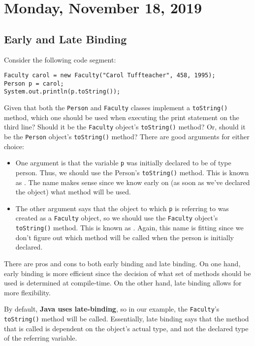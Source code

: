 \section{Monday, November 18, 2019}

\subsection{Early and Late Binding}


Consider the following code segment:

\begin{lstlisting}
Faculty carol = new Faculty("Carol Tuffteacher", 458, 1995);
Person p = carol;
System.out.println(p.toString());
\end{lstlisting}

Given that both the \verb!Person! and \verb!Faculty! classes implement a \verb!toString()! method, which one should be used when executing the print statement on the third line? Should it be the \verb!Faculty! object's \verb!toString()! method? Or, should it be the \verb!Person! object's \verb!toString()! method? There are good arguments for either choice:
\begin{itemize}
    \item One argument is that the variable \verb!p! was initially declared to be of type person. Thus, we should use the Person's \verb!toString()! method. This is known as . The name makes sense since we know early on (as soon as we've declared the object) what method will be used.
    \item The other argument says that the object to which \verb!p! is referring to was created as a \verb!Faculty! object, so we should use the \verb!Faculty! object's \verb!toString()! method. This is known as . Again, this name is fitting since we don't figure out which method will be called when the person is initially declared.
\end{itemize}

There are pros and cons to both early binding and late binding. On one hand, early binding is more efficient since the decision of what set of methods should be used is determined at compile-time. On the other hand, late binding allows for more flexibility.

By default, \textbf{Java uses late-binding}, so in our example, the \verb!Faculty!'s \verb!toString()! method will be called. Essentially, late binding says that the method that is called is dependent on the object's actual type, and not the declared type of the referring variable.

